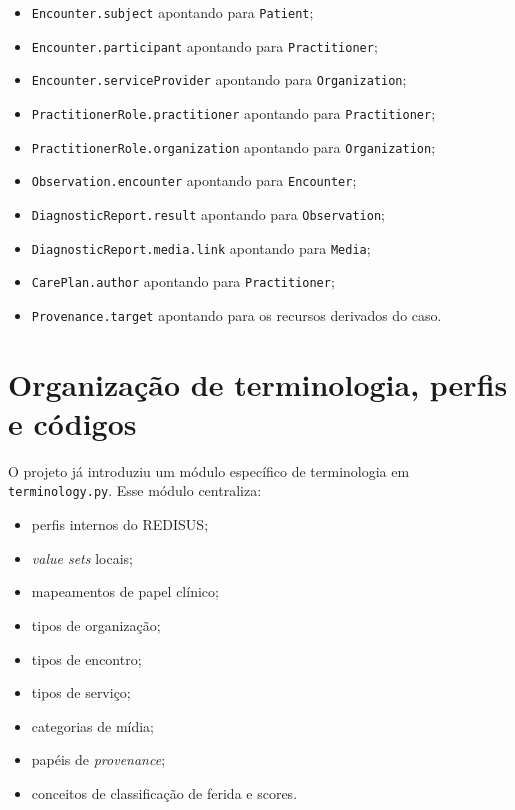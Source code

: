 \documentclass[
    12pt,
    openright,
    oneside,
    a4paper,
    chapter=TITLE,
    section=TITLE,
    brazil,
    sumario=tradicional,
    hidelinks
]{abntex2}
\begin{document}
\begin{itemize}
    \item \texttt{Encounter.subject} apontando para \texttt{Patient};
    \item \texttt{Encounter.participant} apontando para \texttt{Practitioner};
    \item \texttt{Encounter.serviceProvider} apontando para \texttt{Organization};
    \item \texttt{PractitionerRole.practitioner} apontando para \texttt{Practitioner};
    \item \texttt{PractitionerRole.organization} apontando para \texttt{Organization};
    \item \texttt{Observation.encounter} apontando para \texttt{Encounter};
    \item \texttt{DiagnosticReport.result} apontando para \texttt{Observation};
    \item \texttt{DiagnosticReport.media.link} apontando para \texttt{Media};
    \item \texttt{CarePlan.author} apontando para \texttt{Practitioner};
    \item \texttt{Provenance.target} apontando para os recursos derivados do caso.
\end{itemize}

\section{Organiza\c{c}\~ao de terminologia, perfis e c\'odigos}

O projeto j\'a introduziu um m\'odulo espec\'ifico de terminologia em \texttt{terminology.py}. Esse m\'odulo centraliza:

\begin{itemize}
    \item perfis internos do REDISUS;
    \item \textit{value sets} locais;
    \item mapeamentos de papel cl\'inico;
    \item tipos de organiza\c{c}\~ao;
    \item tipos de encontro;
    \item tipos de servi\c{c}o;
    \item categorias de m\'idia;
    \item pap\'eis de \textit{provenance};
    \item conceitos de classifica\c{c}\~ao de ferida e scores.
\end{itemize}
\end{document}
